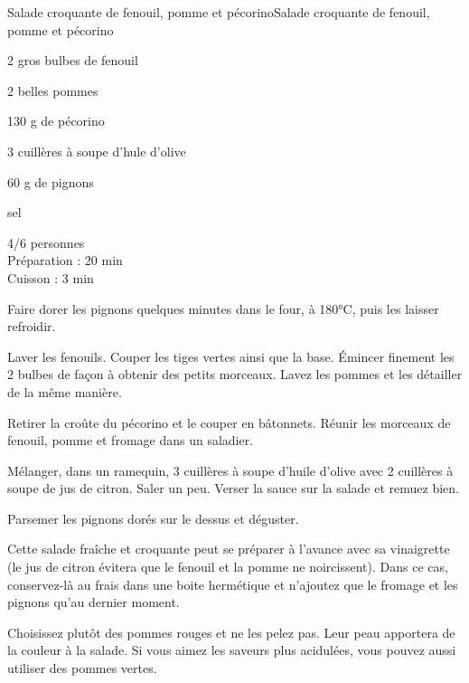 \begin{recette}{Salade croquante de fenouil, pomme et pécorino}{Salade croquante de fenouil, pomme et pécorino}

\begin{ingredients}
 2 gros bulbes de fenouil \par
 2 belles pommes\par
 130 g de pécorino \par
 3 cuillères à soupe d'hule d'olive\par
 60 g de pignons\par
 sel
\end{ingredients}
\begin{infos}
 4/6 personnes	\\	%
 Préparation : 20 min \\		%
 Cuisson : 3 min			%
\end{infos}
\begin{etapes}
\item Faire dorer les pignons quelques minutes dans le four, à 180°C, puis les laisser refroidir.
\item Laver les fenouils. Couper les tiges vertes ainsi que la base. Émincer finement les 2 bulbes de façon à obtenir des petits morceaux. Lavez les pommes et les détailler de la même manière.
\item Retirer la croûte du pécorino et le couper en bâtonnets. Réunir les morceaux de fenouil, pomme et fromage dans un saladier.
\item Mélanger, dans un ramequin, 3 cuillères à soupe d'huile d'olive avec 2 cuillères à soupe de jus de citron. Saler un peu. Verser la sauce sur la salade et remuez bien.
\item Parsemer les pignons dorés sur le dessus et déguster.
\end{etapes}
\begin{conseils}
Cette salade fraîche et croquante peut se préparer à l'avance avec sa vinaigrette (le jus de citron évitera que le fenouil et la pomme ne noircissent). Dans ce cas, conservez-là au frais dans une boite hermétique et n'ajoutez que le fromage et les pignons qu'au dernier moment.

Choisissez plutôt des pommes rouges et ne les pelez pas. Leur peau apportera de la couleur à la salade. Si vous aimez les saveurs plus acidulées, vous pouvez aussi utiliser des pommes vertes.
\end{conseils}
\end{recette}